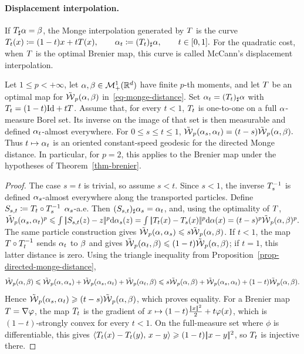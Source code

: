 \paragraph{Displacement interpolation.}
\label{sec-monge-interpolation}
\begin{defn}\label{def-monge-mccann-interpolation}
If $T_\sharp\alpha=\beta$, the Monge interpolation generated by $T$ is the curve
\(T_t(x)\coloneqq(1-t)x+tT(x), \qquad \alpha_t\coloneqq(T_t)_\sharp\alpha, \qquad t\in[0,1].\)
For the quadratic cost, when $T$ is the optimal Brenier map, this curve is called McCann's displacement interpolation.
\end{defn}
\begin{prop}\label{prop-monge-displacement-geodesic}
Let $1\leq p<+\infty$, let $\alpha,\beta\in\mathcal{M}_+^1(\mathbb{R}^d)$ have finite $p$-th moments, and let $T$ be an optimal map for $\tilde{\operatorname{\mathcal{W}}}_p(\alpha,\beta)$ in~\eqref{eq-monge-distance}. Set $\alpha_t=(T_t)_\sharp\alpha$ with $T_t=(1-t)\mathrm{Id}+tT$. Assume that, for every $t<1$, $T_t$ is one-to-one on a full $\alpha$-measure Borel set. Its inverse on the image of that set is then measurable and defined $\alpha_t$-almost everywhere. For $0\leq s\leq t\leq1$,
\(\tilde{\operatorname{\mathcal{W}}}_p(\alpha_s,\alpha_t)=(t-s)\tilde{\operatorname{\mathcal{W}}}_p(\alpha,\beta).\)
Thus $t\mapsto\alpha_t$ is an oriented constant-speed geodesic for the directed Monge distance. In particular, for $p=2$, this applies to the Brenier map under the hypotheses of Theorem~\ref{thm-brenier}.
\end{prop}
\begin{proof}
The case $s=t$ is trivial, so assume $s<t$. Since $s<1$, the inverse $T_s^{-1}$ is defined $\alpha_s$-almost everywhere along the transported particles. Define
$S_{s,t}\coloneqq T_t\circ T_s^{-1}$ $\alpha_s$-a.e.
Then $(S_{s,t})_\sharp\alpha_s=\alpha_t$, and, using the optimality of $T$, \(\tilde{\operatorname{\mathcal{W}}}_p(\alpha_s,\alpha_t)^p \leqslant \int |\!| S_{s,t}(z)-z |\!|^p\mathrm{d}\alpha_s(z) = \int |\!| T_t(x)-T_s(x) |\!|^p\mathrm{d}\alpha(x) = (t-s)^p\tilde{\operatorname{\mathcal{W}}}_p(\alpha,\beta)^p.\)
The same particle construction gives $\tilde{\operatorname{\mathcal{W}}}_p(\alpha,\alpha_s)\leqslant s\tilde{\operatorname{\mathcal{W}}}_p(\alpha,\beta)$. If $t<1$, the map $T\circ T_t^{-1}$ sends $\alpha_t$ to $\beta$ and gives $\tilde{\operatorname{\mathcal{W}}}_p(\alpha_t,\beta)\leqslant(1-t)\tilde{\operatorname{\mathcal{W}}}_p(\alpha,\beta)$; if $t=1$, this latter distance is zero. Using the triangle inequality from Proposition~\ref{prop-directed-monge-distance},
\[
\tilde{\operatorname{\mathcal{W}}}_p(\alpha,\beta)
\leqslant
\tilde{\operatorname{\mathcal{W}}}_p(\alpha,\alpha_s)+\tilde{\operatorname{\mathcal{W}}}_p(\alpha_s,\alpha_t)+\tilde{\operatorname{\mathcal{W}}}_p(\alpha_t,\beta)
\leqslant
s\tilde{\operatorname{\mathcal{W}}}_p(\alpha,\beta)+\tilde{\operatorname{\mathcal{W}}}_p(\alpha_s,\alpha_t)+(1-t)\tilde{\operatorname{\mathcal{W}}}_p(\alpha,\beta).
\]
Hence $\tilde{\operatorname{\mathcal{W}}}_p(\alpha_s,\alpha_t)\geqslant(t-s)\tilde{\operatorname{\mathcal{W}}}_p(\alpha,\beta)$, which proves equality. For a Brenier map $T=\nabla\varphi$, the map $T_t$ is the gradient of
\(x\mapsto (1-t)\frac{|\!| x |\!|^2}{2}+t\varphi(x)\),
which is $(1-t)$-strongly convex for every $t<1$. On the full-measure set where $\phi$ is differentiable, this gives
$\langle T_t(x)-T_t(y),\,x-y\rangle\geqslant(1-t)|\!| x-y |\!|^2$, so $T_t$ is injective there.
\end{proof}
